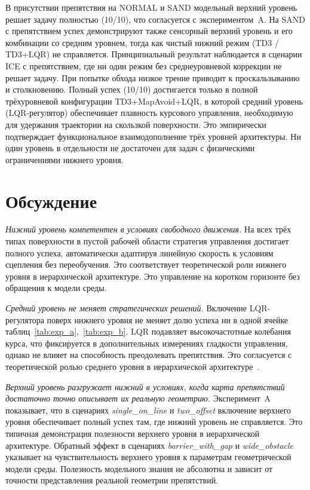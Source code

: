 \documentclass[11pt]{article}
\begin{document}
В присутствии препятствия на NORMAL и SAND модельный верхний уровень
решает задачу полностью (10/10), что согласуется с
экспериментом~A. На SAND с препятствием успех демонстрируют также
сенсорный верхний уровень и его комбинации со средним уровнем, тогда
как чистый нижний режим (TD3 / TD3+LQR) не справляется.
Принципиальный результат наблюдается в сценарии ICE с препятствием, где
ни один режим без среднеуровневой коррекции не решает задачу. При
попытке обхода низкое трение приводит к проскальзыванию и
столкновению. Полный успех (10/10) достигается только в полной
трёхуровневой конфигурации TD3+MapAvoid+LQR, в которой
средний уровень (LQR-регулятор) обеспечивает плавность курсового
управления, необходимую для удержания траектории на скользкой
поверхности. Это эмпирически подтверждает функциональное взаимодополнение трёх уровней архитектуры. Ни один уровень в отдельности не достаточен для задач с физическими ограничениями
нижнего уровня.


\section{Обсуждение}
\label{sec:discussion}

\textit{Нижний уровень компетентен в условиях свободного движения.} На всех трёх типах поверхности в пустой рабочей области стратегия управления достигает полного успеха, автоматически адаптируя линейную скорость к условиям сцепления без переобучения. Это соответствует теоретической роли нижнего уровня в иерархической архитектуре. Это управление на коротком горизонте без обращения к модели среды.

\textit{Средний уровень не меняет стратегических решений.} Включение LQR-регулятора поверх нижнего уровня не меняет долю успеха ни в одной ячейке таблиц~\ref{tab:exp_a},~\ref{tab:exp_b}. LQR подавляет высокочастотные колебания курса, что фиксируется в дополнительных измерениях гладкости управления, однако не влияет на способность преодолевать препятствия. Это согласуется с теоретической ролью среднего уровня в иерархической архитектуре~\cite{kiselev2020dissertation,kiselev2020}.

\textit{Верхний уровень разгружает нижний в условиях, когда карта препятствий достаточно точно описывает их реальную геометрию.} Эксперимент~A показывает, что в сценариях \emph{single\_on\_line} и \emph{two\_offset} включение верхнего уровня обеспечивает полный успех там, где нижний уровень не справляется. Это типичная демонстрация полезности верхнего уровня в иерархической архитектуре. Обратный эффект в сценариях \emph{barrier\_with\_gap} и \emph{wide\_obstacle} указывает на чувствительность верхнего уровня к параметрам геометрической модели среды. Полезность модельного знания не абсолютна и зависит от точности представления реальной геометрии препятствий.
\end{document}
